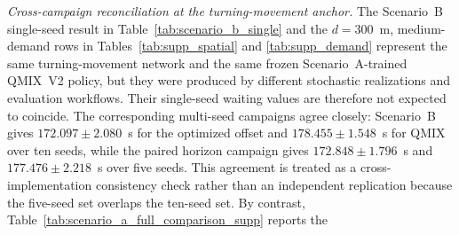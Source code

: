 \documentclass[12pt]{article}
\begin{document}
\begin{table}[H]
\centering
\caption{Single-seed $d=300$~m demand slice from the generated
70\%--15\%--15\% turning-movement joint distance--demand grid,
evaluated with the frozen Scenario~A-trained QMIX~V2 policy. Values are
the exploratory single-seed data used in Figures~SF3--SF6 and in the
integrated DCHF map of the main paper.}
\label{tab:supp_demand}
\small
{}
\end{table}
\textit{Cross-campaign reconciliation at the turning-movement anchor.}
The Scenario~B single-seed result in
Table~\ref{tab:scenario_b_single} and the $d=300$~m, medium-demand
rows in Tables~\ref{tab:supp_spatial} and \ref{tab:supp_demand}
represent the same turning-movement network and the same frozen
Scenario~A-trained QMIX~V2 policy, but they were produced by different
stochastic realizations and evaluation workflows. Their single-seed
waiting values are therefore not expected to coincide. The corresponding
multi-seed campaigns agree closely: Scenario~B gives
$172.097\pm2.080$~s for the optimized offset and
$178.455\pm1.548$~s for QMIX over ten seeds, while the paired horizon
campaign gives $172.848\pm1.796$~s and
$177.476\pm2.218$~s over five seeds. This agreement is treated as a
cross-implementation consistency check rather than an independent
replication because the five-seed set overlaps the ten-seed set.
By contrast, Table~\ref{tab:scenario_a_full_comparison_supp} reports the
\end{document}
